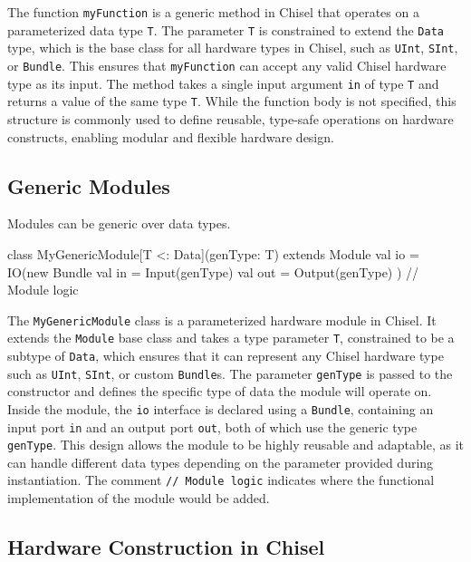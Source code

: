 The function \texttt{myFunction} is a generic method in Chisel that operates on a parameterized data type \texttt{T}. The parameter \texttt{T} is constrained to extend the \texttt{Data} type, which is the base class for all hardware types in Chisel, such as \texttt{UInt}, \texttt{SInt}, or \texttt{Bundle}. This ensures that \texttt{myFunction} can accept any valid Chisel hardware type as its input. The method takes a single input argument \texttt{in} of type \texttt{T} and returns a value of the same type \texttt{T}. While the function body is not specified, this structure is commonly used to define reusable, type-safe operations on hardware constructs, enabling modular and flexible hardware design.

\subsection{Generic Modules}
Modules can be generic over data types.
\begin{chiselcode}
class MyGenericModule[T <: Data](genType: T) extends Module {
  val io = IO(new Bundle {
    val in  = Input(genType)
    val out = Output(genType)
  })
  // Module logic
}
\end{chiselcode}

The \texttt{MyGenericModule} class is a parameterized hardware module in Chisel. It extends the \texttt{Module} base class and takes a type parameter \texttt{T}, constrained to be a subtype of \texttt{Data}, which ensures that it can represent any Chisel hardware type such as \texttt{UInt}, \texttt{SInt}, or custom \texttt{Bundle}s. The parameter \texttt{genType} is passed to the constructor and defines the specific type of data the module will operate on. Inside the module, the \texttt{io} interface is declared using a \texttt{Bundle}, containing an input port \texttt{in} and an output port \texttt{out}, both of which use the generic type \texttt{genType}. This design allows the module to be highly reusable and adaptable, as it can handle different data types depending on the parameter provided during instantiation. The comment \texttt{// Module logic} indicates where the functional implementation of the module would be added.


\subsection{Hardware Construction in Chisel}

